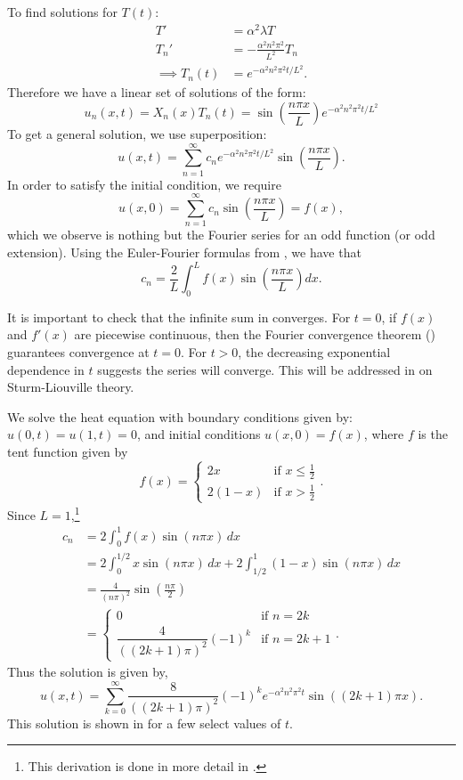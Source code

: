 To find solutions for $T(t)$:
\begin{align*}
	T' &= \alpha^2 \lambda T \\
	T_n' &= -\frac{\alpha^2 n^2 \pi^2}{L^2} T_n \\ 
	\implies T_n(t) &= e^{-\alpha^2 n^2 \pi^2 t/L^2}.
\end{align*}
Therefore we have a linear set of solutions of the form:
\[
u_n(x,t) = X_n(x)T_n(t) = \sin\left(\frac{n\pi x}{L}\right) e^{-\alpha^2 n^2 \pi^2 t/L^2}
\]
To get a general solution, we use superposition:
\begin{equation}\label{eq:heateqsol}
	u(x,t) = \sum_{n=1}^{\infty} c_n e^{-\alpha^2 n^2 \pi^2 t/L^2} \sin\left(\frac{n\pi x}{L}\right).
\end{equation}
In order to satisfy the initial condition, we require
\[
u(x,0) = \sum_{n=1}^{\infty} c_n \sin\left(\frac{n\pi x}{L}\right) = f(x),
\]
which we observe is nothing but the Fourier series for an odd function (or odd extension). Using the Euler-Fourier formulas from , we have that
\begin{equation}\label{eq:heatfourier}
	c_n = \frac{2}{L} \int_0^L f(x)\sin\left(\frac{n\pi x}{L}\right) dx.
\end{equation}

It is important to check that the infinite sum in  converges. For $t=0$, if $f(x)$ and $f'(x)$ are piecewise continuous, then the Fourier convergence theorem () guarantees convergence at $t=0$. For $t>0$, the decreasing exponential dependence in $t$ suggests the series will converge. This will be addressed in  on Sturm-Liouville theory.

\begin{eg}\label{eg:heateqn1}
	We solve the heat equation with boundary conditions given by: $u(0,t) = u(1,t) = 0$, and initial conditions $u(x,0) = f(x)$, where $f$ is the tent function given by
	\[
	f(x) = \begin{cases} 2x & \text{if } x \leq \frac12 \\ 2(1-x) & \text{if } x>\frac12 \end{cases}.
	\]
	Since $L=1$,\footnote{This derivation is done in more detail in .}
	\begin{align*}
		c_n &= 2 \int_0^1 f(x) \sin(n\pi x) \,dx \\
		&= 2 \int_0^{1/2} x \sin(n\pi x) \,dx + 2 \int_{1/2}^1 (1-x) \sin(n\pi x) \,dx \\
		&= \frac{4}{(n \pi)^2} \sin \left(\frac{n \pi}{2}\right) \\
		&= \begin{cases}0 & \text{if } n = 2k \\ \dfrac{4}{((2k+1)\pi)^2} (-1)^k & \text{if } n = 2k+1\end{cases}.
	\end{align*}
	Thus the solution is given by, 
	\[
	u(x,t) = \sum_{k=0}^{\infty} \frac{8}{((2k+1)\pi)^2} (-1)^k e^{-\alpha^2 n^2 \pi^2 t} \sin\left((2k+1)\pi x\right).
	\]
	This solution is shown in  for a few select values of $t$.
\end{eg}


